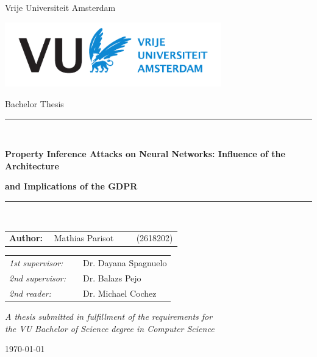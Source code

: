 \documentclass[11pt]{article}
\begin{document}
\thispagestyle{empty}

\begin{center}

Vrije Universiteit Amsterdam

\vspace{1mm}

\includegraphics[height=28mm]{vu-griffioen-white.pdf}

\vspace{1.5cm}

{\Large Bachelor Thesis}

\vspace*{1.5cm}

\rule{.9\linewidth}{.6pt}\\[0.4cm]
{\huge \bfseries Property Inference Attacks on Neural Networks: Influence of the Architecture\par}
{\huge \bfseries and Implications of the GDPR\par}\vspace{0.4cm}
\rule{.9\linewidth}{.6pt}\\[1.5cm]

\vspace*{2mm}

{\Large
\begin{tabular}{l}
{\bf Author:} ~~Mathias Parisot ~~~~ (2618202)
\end{tabular}
}

\vspace*{1.5cm}

\begin{tabular}{ll}
{\it 1st supervisor:}   & ~~Dr. Dayana Spagnuelo \\
{\it 2nd supervisor:} & ~~Dr. Balazs Pejo \\
{\it 2nd reader:}       & ~~Dr. Michael Cochez
\end{tabular}

\vspace*{2cm}

\textit{A thesis submitted in fulfillment of the requirements for\\ the VU Bachelor of Science degree in Computer Science }

\vspace*{1cm}

\today\\[4cm] %

\end{center}
\end{document}
